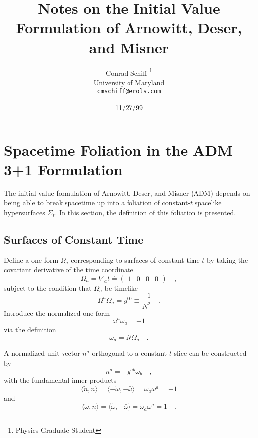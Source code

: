\documentclass[twocolumn]{article}
\def\.{{\quad .}}
\def\_,{{\quad ,}}
\begin{document}
\title{Notes on the Initial Value Formulation of Arnowitt, Deser, and Misner}
\author{Conrad Schiff \thanks{Physics Graduate Student} \\
        University of Maryland\\
      \texttt{cmschiff@erols.com}}
\date{11/27/99}
\maketitle
%

\section{Spacetime Foliation in the ADM 3+1 Formulation}\label{S:ADM_folio}

The initial-value formulation of Arnowitt, Deser, and Misner (ADM) depends on
being able to break spacetime up into a foliation of constant-$t$ spacelike
hypersurfaces $\Sigma_t$.  In this section, the definition of this foliation
is presented.


\subsection{Surfaces of Constant Time}\label{SS:const_t}

Define a one-form $\Omega_a$ corresponding to surfaces of constant time $t$ by
taking the covariant derivative of the time coordinate
\begin{equation}\label{eq:cov_time}
   \Omega_{a} = \nabla_{a} t
              \doteq \left( \begin{array}{cccc} 1&0&0&0 \end{array} \right) \_,
\end{equation}
subject to the condition that $\Omega_a$ be timelike
\[
   \Omega^{a} \Omega_{a} = g^{00} \equiv \frac{-1}{N^2} \.
\]
Introduce the normalized one-form
\begin{equation}\label{eq:norm_form}
   \omega^{a} \omega_{a} = -1
\end{equation}
via the definition
\[
   \omega_{a} = N \Omega_{a} \.
\]

A normalized unit-vector ${n^a}$ orthogonal to a constant-$t$ slice can be
constructed by
\begin{equation}\label{eq:unit_norm}
   n^{a} = - g^{a b} \omega_{b} \_,
\end{equation}
with the fundamental inner-products
\[
   \langle \tilde n , \bar n \rangle =
   \langle -\tilde \omega , -\bar \omega \rangle =
   \omega_{a} \omega^{a} = -1
\]
and
\[
   \langle \tilde \omega ,  \bar n \rangle =
   \langle \tilde \omega , -\bar \omega \rangle =
   \omega_{a} \omega^{a} = 1 \.
\]
\end{document}
